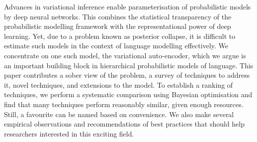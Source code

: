 Advances in variational inference enable parameterisation of probabilistic models by deep neural networks. This combines the statistical transparency of the probabilistic modelling framework with the representational power of deep learning. Yet, due to a problem known as posterior collapse, it is difficult to estimate such models in the context of language modelling effectively. We concentrate on one such model, the variational auto-encoder, which we argue is an important building block in hierarchical probabilistic models of language. This paper contributes a sober view of the problem, a survey of techniques to address it, novel techniques, and extensions to the model. To establish a ranking of techniques, we perform a systematic comparison using Bayesian optimisation and find that many techniques perform reasonably similar, given enough resources. Still, a favourite can be named based on convenience. We also make several empirical observations and recommendations of best practices that should help researchers interested in this exciting field.
